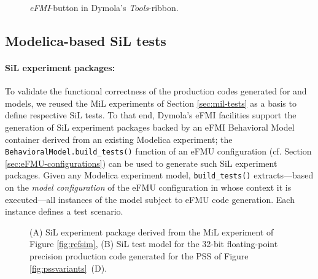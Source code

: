 \begin{figure}[h!]%
\centerline{}
    \vspace{-2ex}
    \caption{\textit{eFMI}-button in Dymola's \textit{Tools}-ribbon.}
    \label{fig:eFMI-tools-ribbon-button}
    \vspace{-2ex}
\end{figure}

\subsection{Modelica-based SiL tests}\label{sec:modelica-based-sil-tests}

\paragraph{SiL experiment packages:} To validate the functional correctness of the production codes generated for \controller{} and \plant{} models, we reused the MiL experiments of Section \ref{sec:mil-tests} as a basis to define respective SiL tests. To that end, Dymola's eFMI facilities support the generation of SiL experiment packages backed by an eFMI Behavioral Model container derived from an existing Modelica experiment; the \texttt{BehavioralModel.build\_tests()} function of an eFMU configuration (cf. Section \ref{sec:eFMU-configurations}) can be used to generate such SiL experiment packages. Given any Modelica experiment model, \texttt{build\_tests()} extracts---based on the \textit{model configuration} of the eFMU configuration in whose context it is executed---all instances of the model subject to eFMU code generation. Each instance defines a test scenario. 

\begin{figure}[t!]
    \centerline{}
    \vspace{-2ex}
    \caption{(A) SiL experiment package derived from the MiL experiment of Figure \ref{fig:refsim}, (B) SiL test model for the 32-bit floating-point precision production code generated for the PSS \controller{} of Figure \ref{fig:pssvariants}~(D).}
    \label{fig:SiL-test}
    \vspace{-2ex}
\end{figure}

